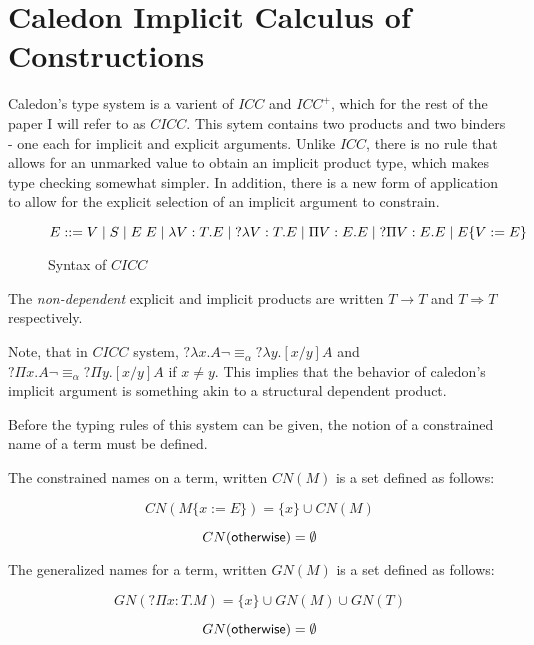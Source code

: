 \section{Caledon Implicit Calculus of Constructions}

Caledon's type system is a varient of $ICC$ and $ICC^+$, 
which for the rest of the paper I will refer to as $CICC$.  
This sytem contains two products and two binders - one each for implicit and explicit arguments. 
Unlike $ICC$, there is no rule that allows for an unmarked value to obtain an implicit product type, which
makes type checking somewhat simpler.  
In addition, there is a new form of application to allow for the explicit
selection of an implicit argument to constrain.

\begin{figure}[H]
\[ 
E ::= 
V 
\; | \; S 
\; | \; E\;E 
\; | \; \lambda V : T. E 
\; | \; ?\lambda V : T. E 
\; | \; \Pi V : E . E 
\; | \; ?\Pi V : E . E 
\; | \; E \{ V := E \}
\]

\caption{Syntax of $CICC$}
\label{cicc:syntax}
\end{figure}

The \textit{non-dependent} explicit and implicit products are written $T \rightarrow T$ 
and $T \Rightarrow T$ respectively.

Note, that in $CICC$ system, $?\lambda x . A \neg\equiv_\alpha ?\lambda y . [x / y] A$ 
and $?\Pi x . A \neg\equiv_\alpha ?\Pi y . [x / y] A$  if $x \neq y$.  
This implies that the behavior of caledon's implicit argument is something akin to a structural dependent product.  

Before the typing rules of this system can be given, the notion of a constrained name of a term must be defined.

\begin{definition}
The constrained names on a term, written $CN(M)$ is a set defined as follows:

\[
CN(M \{ x := E \}) = \{ x \} \cup CN(M)
\]

\[ 
CN(\mathsf{otherwise}) = \emptyset
\]

\end{definition}

\begin{definition}
The generalized names for a term, written $GN(M)$ is a set defined as follows:

\[ 
GN(?\Pi x : T . M) = \{ x \} \cup GN(M) \cup GN(T)
\]

\[ 
GN(\mathsf{otherwise}) = \emptyset
\]

\end{definition}

